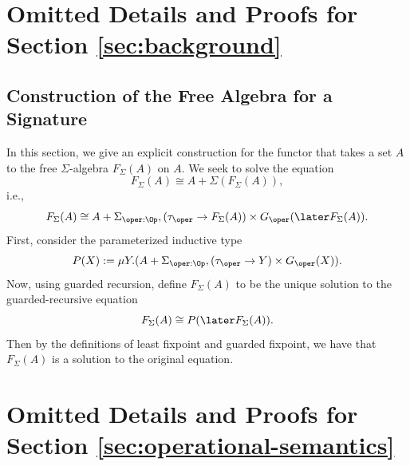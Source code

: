 \section{Omitted Details and Proofs for Section \ref{sec:background}}


\subsection{Construction of the Free Algebra for a Signature}\label{sec:app:free-signature-monad}

In this section, we give an explicit construction for the functor that takes a
set $A$ to the free $\Sigma$-algebra $F_\Sigma(A)$ on $A$.
%
We seek to solve the equation
%
\[ F_\Sigma(A) \cong A + \Sigma(F_\Sigma(A)), \]
%
i.e.,
%
\[ F_\Sigma(A) \cong A + \Sigma_{\oper: \Op}, 
    (\tau_\oper \to F_\Sigma(A)) \times G_\oper(\later F_\Sigma(A)). \]
%
First, consider the parameterized inductive type 
%
\[ P(X) := \mu Y. (A + \Sigma_{\oper : \Op}, (\tau_\oper \to Y) \times G_\oper(X)). \]
%
Now, using guarded recursion, define $F_\Sigma(A)$ to be the unique solution to
the guarded-recursive equation
%
\[ F_\Sigma(A) \cong P(\later F_\Sigma(A)). \]
%
Then by the definitions of least fixpoint and guarded fixpoint, we have that
$F_\Sigma(A)$ is a solution to the original equation.

\section{Omitted Details and Proofs for Section \ref{sec:operational-semantics}}

